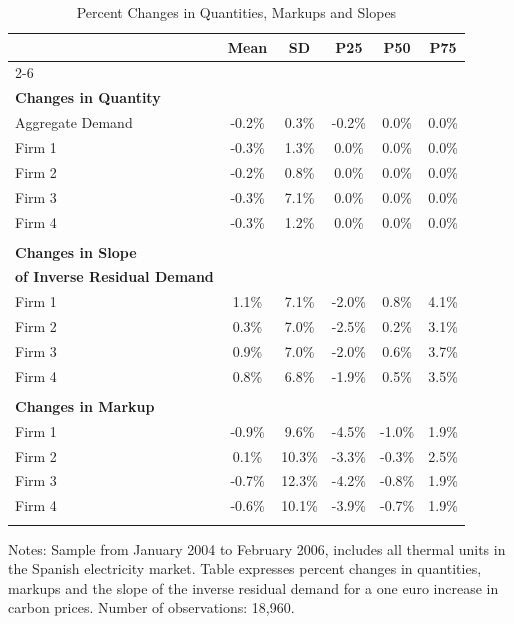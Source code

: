 \begin{table}
\centering
\caption{Percent Changes in Quantities, Markups and Slopes} \label{tab:qfirm}

\begin{tabular*}{.9\textwidth}{@{\extracolsep{\fill}} l  c  c  c  c  c }
\hline\hline 
 & \textbf{Mean}  & \textbf{SD}  & \textbf{P25}  & \textbf{P50} & \textbf{P75}  \\ \cline{2-6} \\[-\sep]
\textbf{Changes in Quantity }  \\[\sep]
\quad Aggregate Demand  & -0.2\% &  0.3\% & -0.2\% &  0.0\% &  0.0\% \\[\sep] 
\quad Firm 1  & -0.3\% &  1.3\% &  0.0\% &  0.0\% &  0.0\% \\[\sep] 
\quad Firm 2  & -0.2\% &  0.8\% &  0.0\% &  0.0\% &  0.0\% \\[\sep] 
\quad Firm 3  & -0.3\% &  7.1\% &  0.0\% &  0.0\% &  0.0\% \\[\sep] 
\quad Firm 4  & -0.3\% &  1.2\% &  0.0\% &  0.0\% &  0.0\% \\[\sep] 
\hline \\[-\sep]
\textbf{Changes in Slope} \\ \textbf{of Inverse Residual Demand} \\[\sep]
\quad Firm 1  &  1.1\% &  7.1\% & -2.0\% &  0.8\% &  4.1\% \\[\sep] 
\quad Firm 2  &  0.3\% &  7.0\% & -2.5\% &  0.2\% &  3.1\% \\[\sep] 
\quad Firm 3  &  0.9\% &  7.0\% & -2.0\% &  0.6\% &  3.7\% \\[\sep] 
\quad Firm 4  &  0.8\% &  6.8\% & -1.9\% &  0.5\% &  3.5\% \\[\sep] 
\hline \\[-\sep]
\textbf{Changes in Markup}  \\[\sep]
\quad Firm 1  & -0.9\% &  9.6\% & -4.5\% & -1.0\% &  1.9\% \\[\sep] 
\quad Firm 2  &  0.1\% & 10.3\% & -3.3\% & -0.3\% &  2.5\% \\[\sep] 
\quad Firm 3  & -0.7\% & 12.3\% & -4.2\% & -0.8\% &  1.9\% \\[\sep] 
\quad Firm 4  & -0.6\% & 10.1\% & -3.9\% & -0.7\% &  1.9\% \\[\sep] 
\hline\hline \vspace{-18pt}
\end{tabular*}
\begin{minipage}[c]{.9\textwidth}
{\footnotesize \vspace{6pt}
\noindent
Notes: Sample from January 2004 to February 2006, includes all thermal units in the Spanish electricity market. 
Table expresses percent changes in quantities, markups and the slope of the inverse residual demand for a one euro 
increase in carbon prices. Number of observations: 18,960. } \end{minipage}
\end{table}
